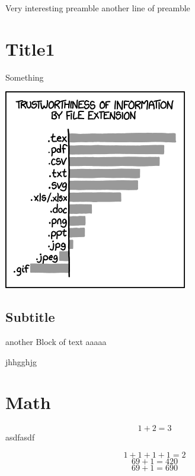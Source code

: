 Very interesting preamble
another line of preamble

\section{Title1}
Something

\includegraphics{image.png}
\subsection{Subtitle}
another Block of text
aaaaa

jhhgghjg

\section{Math}
$$1+2 = 3$$
asdfasdf

\[1+1+1+1=2\]
\begin{displaymath}
69 + 1 = 420
\end{displaymath}
\begin{equation}
69 + 1 = 690
\end{equation}

